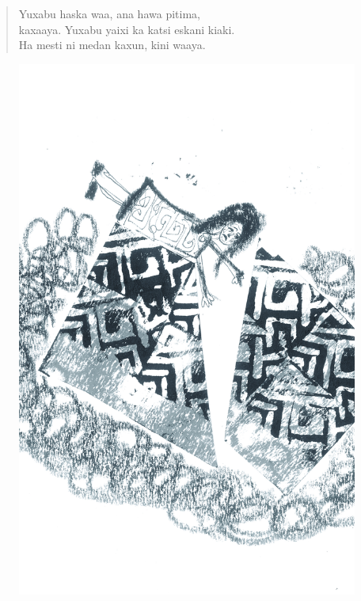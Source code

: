 \begin{verse}
Yuxabu haska waa, ana hawa pitima,\\
kaxaaya. Yuxabu yaixi ka katsi eskani kiaki.\\
Ha mesti ni medan kaxun, kini waaya.
\end{verse}

\vspace*{\fill}

\pagebreak
\thispagestyle{empty}
\begin{figure}
\vspace*{-1.6cm}
\hspace*{-2.2cm}\includegraphics[width=138mm]{./imgs/img7.jpg}
\end{figure}


